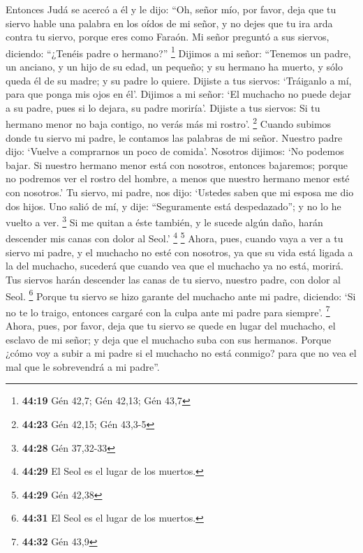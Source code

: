 \begin{paracol}{2}
 Entonces Judá se acercó a él y le dijo: ``Oh, señor mío,
por favor, deja que tu siervo hable una palabra en los oídos de mi
señor, y no dejes que tu ira arda contra tu siervo, porque eres como
Faraón.  Mi señor preguntó a sus siervos, diciendo:
``¿Tenéis padre o hermano?'' \footnote{\textbf{44:19} Gén 42,7; Gén
  42,13; Gén 43,7}  Dijimos a mi señor: ``Tenemos un
padre, un anciano, y un hijo de su edad, un pequeño; y su hermano ha
muerto, y sólo queda él de su madre; y su padre lo quiere.
 Dijiste a tus siervos: `Tráiganlo a mí, para que ponga
mis ojos en él'.  Dijimos a mi señor: `El muchacho no
puede dejar a su padre, pues si lo dejara, su padre moriría'.
 Dijiste a tus siervos: Si tu hermano menor no baja
contigo, no verás más mi rostro'. \footnote{\textbf{44:23} Gén 42,15;
  Gén 43,3-5}  Cuando subimos donde tu siervo mi padre,
le contamos las palabras de mi señor.  Nuestro padre
dijo: `Vuelve a comprarnos un poco de comida'.  Nosotros
dijimos: `No podemos bajar. Si nuestro hermano menor está con nosotros,
entonces bajaremos; porque no podremos ver el rostro del hombre, a menos
que nuestro hermano menor esté con nosotros.'  Tu siervo,
mi padre, nos dijo: `Ustedes saben que mi esposa me dio dos hijos.
 Uno salió de mí, y dije: ``Seguramente está
despedazado''; y no lo he vuelto a ver. \footnote{\textbf{44:28} Gén
  37,32-33}  Si me quitan a éste también, y le sucede
algún daño, harán descender mis canas con dolor al Seol.' \footnote{\textbf{44:29}
  El Seol es el lugar de los muertos.} \footnote{\textbf{44:29} Gén
  42,38}  Ahora, pues, cuando vaya a ver a tu siervo mi
padre, y el muchacho no esté con nosotros, ya que su vida está ligada a
la del muchacho,  sucederá que cuando vea que el muchacho
ya no está, morirá. Tus siervos harán descender las canas de tu siervo,
nuestro padre, con dolor al Seol. \footnote{\textbf{44:31} El Seol es el
  lugar de los muertos.}  Porque tu siervo se hizo
garante del muchacho ante mi padre, diciendo: `Si no te lo traigo,
entonces cargaré con la culpa ante mi padre para siempre'. \footnote{\textbf{44:32}
  Gén 43,9}  Ahora, pues, por favor, deja que tu siervo
se quede en lugar del muchacho, el esclavo de mi señor; y deja que el
muchacho suba con sus hermanos.  Porque ¿cómo voy a subir
a mi padre si el muchacho no está conmigo? para que no vea el mal que le
sobrevendrá a mi padre''.


\end{paracol}
